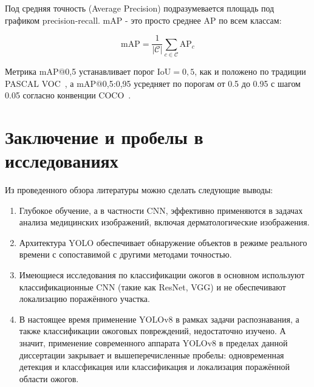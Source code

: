 Под средняя точность (Average Precision) подразумевается площадь под графиком precision-recall. mAP - это просто среднее AP по всем классам:

\begin{equation}
\text{mAP} = \frac{1}{|\mathcal{C}|} \sum_{c \in \mathcal{C}} \text{AP}_c
\label{eq:map_def}
\end{equation}

Метрика mAP@0{,}5 устанавливает порог IoU${=}0{,}5$, как и положено по традиции PASCAL VOC~\cite{everingham2010pascal}, а mAP@0{,}5:0{,}95 усредняет по порогам от 0.5 до 0.95 с шагом 0.05 согласно конвенции COCO~\cite{lin2014coco}. \section{Заключение и пробелы в исследованиях}

Из проведенного обзора литературы можно сделать следующие выводы:
\begin{enumerate}
\item Глубокое обучение, а в частности CNN, эффективно применяются в задачах анализа медицинских изображений, включая дерматологические изображения. \item Архитектура YOLO обеспечивает обнаружение объектов в режиме реального времени с сопоставимой с другими методами точностью.
\item Имеющиеся исследования по классификации ожогов в основном используют классификационные CNN (такие как ResNet, VGG) и не обеспечивают локализацию поражённого участка. \item В настоящее время применение YOLOv8 в рамках задачи распознавания, а также классификации ожоговых повреждений, недостаточно изучено. А значит, применение современного аппарата YOLOv8 в пределах данной диссертации закрывает и вышеперечисленные пробелы: одновременная детекция и классфикация или классификация и локализация поражённой области ожогов.
\end{enumerate}